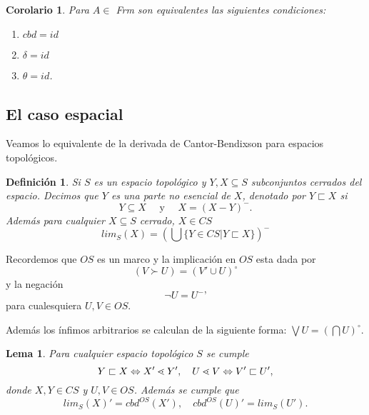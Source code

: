 \documentclass[12pt,letterpaper,titlepage]{article}
\newtheorem*{defn}{Definición}
\newtheorem{lemma}{Lema}
\newtheorem*{cor}{Corolario}
\theoremstyle{definition}
\newcommand\<{\langle}
\renewcommand\>{\rangle}
\begin{document}
\begin{cor}
Para $A\in$ \textit{Frm} son equivalentes las siguientes condiciones:
\begin{enumerate}
\item $cbd=id$
\item $\delta=id$
\item $\theta=id$.
\end{enumerate}
\end{cor}

\subsection{El caso espacial}
Veamos lo equivalente de la derivada de Cantor-Bendixson para espacios topológicos.

\begin{defn}
Si $S$ es un espacio topológico y $Y, X\subseteq S$ subconjuntos cerrados del espacio. Decimos que $Y$ es una parte no esencial de $X$, denotado por $Y\sqsubset X$ si 
$$Y\subseteq X \quad\mbox{ y }\quad X=(X-Y)^-.$$ 
Además para cualquier $X\subseteq S$ cerrado, $X\in CS$
$$lim_S(X)=\left(\bigcup\{Y\in CS|Y\sqsubset X\}\right)^-$$
\end{defn}

\noindent
Recordemos que $OS$ es un marco y la implicación en $OS$ esta dada por $$(V\succ U)=(V'\cup U)^\circ$$ 
y la negación $$\neg U=U^-\mbox{'}$$ para cualesquiera $U,V\in OS$.

\noindent
Además los ínfimos arbitrarios se calculan de la siguiente forma: $\bigvee U=\left(\bigcap U\right)^\circ$.

\begin{lemma}\label{Lema50}
Para cualquier espacio topológico $S$ se cumple $$Y\sqsubset X\Leftrightarrow X'\lessdot Y',\mbox\quad U\lessdot V\Leftrightarrow V'\sqsubset U',$$
donde $X, Y\in CS$ y $U, V\in OS$. Además se cumple que $$lim_S(X)'=cbd^{OS}(X'),\quad cbd^{OS}(U)'=lim_S(U').$$
\end{lemma}
\end{document}
